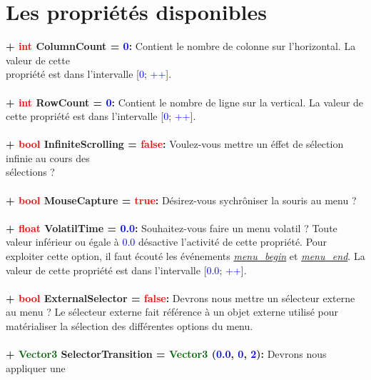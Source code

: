 \documentclass[a4paper, 11pt]{article}
\begin{document}
	\section{Les propriétés disponibles}
	\textbf{+ \textcolor{red}{int} \hypertarget{ccount}{ColumnCount} = \textcolor{blue}{0}:} Contient le 
	nombre de colonne sur l'horizontal. La valeur de cette \\propriété est dans l'intervalle 
	[\textcolor{blue}{0}; \textcolor{blue}{++}].\\\\
	\textbf{+ \textcolor{red}{int} \hypertarget{rcount}{RowCount} = \textcolor{blue}{0}:} Contient le nombre 
	de ligne sur la vertical. La valeur de cette propriété est dans l'intervalle [\textcolor{blue}{0}; 
	\textcolor{blue}{++}].\\\\
	\textbf{+ \textcolor{red}{bool} InfiniteScrolling = \textcolor{red}{false}:} Voulez-vous mettre un éffet 
	de sélection infinie au cours des \\sélections ?\\\\
	\textbf{+ \textcolor{red}{bool} MouseCapture = \textcolor{red}{true}:} Désirez-vous sychrôniser la 
	souris au menu ?\\\\
	\textbf{+ \textcolor{red}{float} VolatilTime = \textcolor{blue}{0.0}:} Souhaitez-vous faire un menu 
	volatil ? Toute valeur inférieur ou égale à \textcolor{blue}{0.0} désactive l'activité de cette 
	propriété. Pour exploiter cette option, il faut écouté les événements \textit{\hyperlink{mbegin}
	{menu\_begin}} et \textit{\hyperlink{mend}{menu\_end}}. La valeur de cette propriété est dans 
	l'intervalle [\textcolor{blue}{0.0}; \textcolor{blue}{++}].\\\\
	\textbf{+ \textcolor{red}{bool} ExternalSelector = \textcolor{red}{false}:} Devrons nous mettre un 
	sélecteur externe au menu ? Le sélecteur externe fait référence à un objet externe utilisé pour 
	matérialiser la sélection des différentes options du menu.\\\\
	\textbf{+ \textcolor{darkgreen}{Vector3} SelectorTransition = \textcolor{darkgreen}{Vector3}
	(\textcolor{blue}{0.0}, \textcolor{blue}{0}, \textcolor{blue}{2}):} Devrons nous appliquer une 
\end{document}
